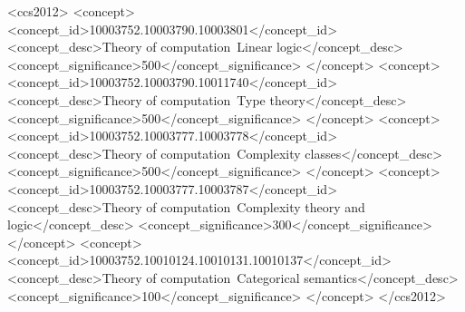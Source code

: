 \documentclass[acmsmall,screen]{acmart}
\begin{document}
\begin{CCSXML}
<ccs2012>
   <concept>
       <concept_id>10003752.10003790.10003801</concept_id>
       <concept_desc>Theory of computation~Linear logic</concept_desc>
       <concept_significance>500</concept_significance>
       </concept>
   <concept>
       <concept_id>10003752.10003790.10011740</concept_id>
       <concept_desc>Theory of computation~Type theory</concept_desc>
       <concept_significance>500</concept_significance>
       </concept>
   <concept>
       <concept_id>10003752.10003777.10003778</concept_id>
       <concept_desc>Theory of computation~Complexity classes</concept_desc>
       <concept_significance>500</concept_significance>
       </concept>
   <concept>
       <concept_id>10003752.10003777.10003787</concept_id>
       <concept_desc>Theory of computation~Complexity theory and logic</concept_desc>
       <concept_significance>300</concept_significance>
       </concept>
   <concept>
       <concept_id>10003752.10010124.10010131.10010137</concept_id>
       <concept_desc>Theory of computation~Categorical semantics</concept_desc>
       <concept_significance>100</concept_significance>
       </concept>
 </ccs2012>
\end{CCSXML}




\maketitle

\end{document}
